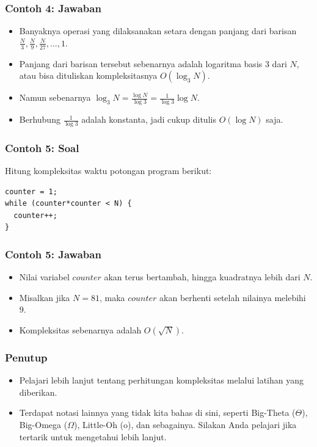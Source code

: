 \begin{frame}
\frametitle{Contoh 4: Jawaban}
\begin{itemize}
  \item Banyaknya operasi yang dilaksanakan setara dengan panjang dari barisan $\frac{N}{3}, \frac{N}{9}, \frac{N}{27}, ..., 1$.
  \item Panjang dari barisan tersebut sebenarnya adalah logaritma basis 3 dari $N$, atau bisa dituliskan kompleksitasnya $O(\log_3{N})$.
  \item Namun sebenarnya $\log_3{N} = \frac{\log{N}}{\log{3}} = \frac{1}{\log{3}} \log{N}$.
  \item Berhubung $\frac{1}{\log{3}}$ adalah konstanta, jadi cukup ditulis $O(\log{N})$ saja.
\end{itemize}
\end{frame}

\begin{frame}[fragile]
\frametitle{Contoh 5: Soal}
Hitung kompleksitas waktu potongan program berikut:

\hfill

\begin{lstlisting}
counter = 1;
while (counter*counter < N) {
  counter++;
}
\end{lstlisting}
\end{frame}

\begin{frame}
\frametitle{Contoh 5: Jawaban}
\begin{itemize}
  \item Nilai variabel $counter$ akan terus bertambah, hingga kuadratnya lebih dari $N$.
  \item Misalkan jika $N = 81$, maka $counter$ akan berhenti setelah nilainya melebihi $9$.
  \item Kompleksitas sebenarnya adalah $O(\sqrt{N})$.
\end{itemize}
\end{frame}

\begin{frame}
\frametitle{Penutup}
\begin{itemize}
  \item Pelajari lebih lanjut tentang perhitungan kompleksitas melalui latihan yang diberikan.
  \item Terdapat notasi lainnya yang tidak kita bahas di sini, seperti Big-Theta ($\Theta$), Big-Omega ($\Omega$), Little-Oh (o), dan sebagainya. Silakan Anda pelajari jika tertarik untuk mengetahui lebih lanjut.
\end{itemize}
\end{frame}


